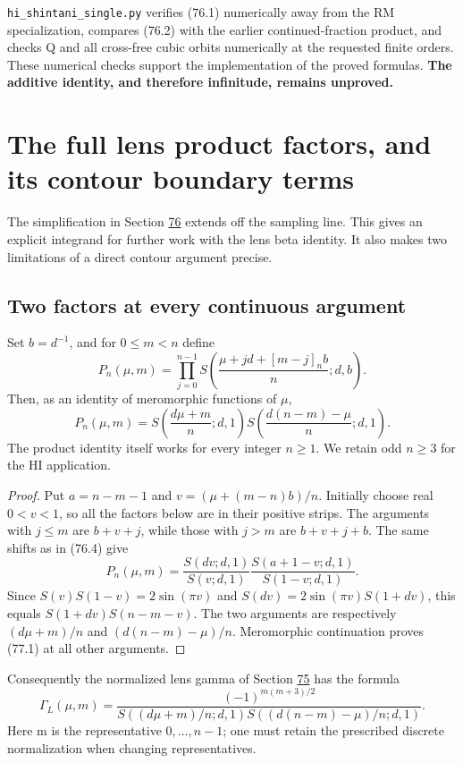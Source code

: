 \documentclass[11pt,reqno]{amsart}
\theoremstyle{plain}
\begin{document}
\texttt{hi\_\allowbreak shintani\_\allowbreak single.py} verifies (76.1) numerically away from the RM
specialization, compares (76.2) with the earlier continued-fraction
product, and checks Q and all cross-free cubic orbits numerically at
the requested finite orders. These numerical checks support the
implementation of the proved formulas. \textbf{The additive identity, and
therefore infinitude, remains unproved.}

\section{The full lens product factors, and its contour boundary terms}\label{sec:77}

The simplification in Section \hyperref[sec:76]{76} extends off the sampling line. This
gives an explicit integrand for further work with the lens beta identity.
It also makes two limitations of a direct contour argument precise.

\subsection{Two factors at every continuous argument}\label{sec:77.1}

Set \(b=d^{-1}\), and for \(0\le m<n\) define
\[
 P_n(\mu,m)=\prod_{j=0}^{n-1}
 S\!\left(\frac{\mu+jd+[m-j]_n b}{n};d,b\right).
\]
Then, as an identity of meromorphic functions of \(\mu\),
\begin{equation*}
 \boxed{\displaystyle
 P_n(\mu,m)=
 S\!\left(\frac{d\mu+m}{n};d,1\right)
 S\!\left(\frac{d(n-m)-\mu}{n};d,1\right).}
 \tag{77.1}
\end{equation*}
The product identity itself works for every integer \(n\ge1\).
We retain odd \(n\ge3\) for the HI application.

\begin{proof}
Put \(a=n-m-1\) and
\(v=(\mu+(m-n)b)/n\). Initially choose real \(0<v<1\),
so all the factors below are in their positive strips. The arguments
with \(j\le m\) are \(b+v+j\), while those with \(j>m\)
are \(b+v+j+b\). The same shifts as in (76.4) give
\[
 P_n(\mu,m)=
 \frac{S(dv;d,1)}{S(v;d,1)}
 \frac{S(a+1-v;d,1)}{S(1-v;d,1)}.
\]
Since \(S(v)S(1-v)=2\sin(\pi v)\) and
\(S(dv)=2\sin(\pi v)S(1+dv)\), this equals
\(S(1+dv)S(n-m-v)\). The two arguments are respectively
\((d\mu+m)/n\) and \((d(n-m)-\mu)/n\).
Meromorphic continuation proves (77.1) at all other arguments.
\end{proof}

Consequently the normalized lens gamma of Section \hyperref[sec:75]{75} has the formula
\begin{equation*}
 \Gamma_L(\mu,m)=
 \frac{(-1)^{m(m+3)/2}}
 {S((d\mu+m)/n;d,1)S((d(n-m)-\mu)/n;d,1)}.
 \tag{77.2}
\end{equation*}
Here m is the representative \(0,\ldots,n-1\); one must retain
the prescribed discrete normalization when changing representatives.
\end{document}
